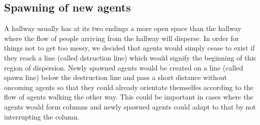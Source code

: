 \subsection{Spawning of new agents}
A hallway usually has at its two endings a more open space than the hallway where the flow of people arriving from the hallway will disperse. In order for things not to get too messy, we decided that agents would simply cease to exist if they reach a line (called dstruction line) which would signify the beginning of this region of dispersion. Newly spawned agents would be created on a line (called spawn line) below the destruction line and pass a short distance without oncoming agents so that they could already orientate themselfes according to the flow of agents walking the other way. This could be important in cases where the agents would form columns and newly spawned agents could adapt to that by not interrupting the column.\\

